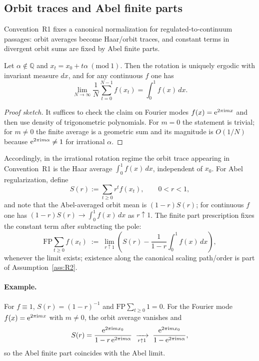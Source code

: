 \subsection{Orbit traces and Abel finite parts}
Convention~R1 fixes a canonical normalization for regulated-to-continuum passages: orbit averages become Haar/orbit traces, and constant terms in divergent orbit sums are fixed by Abel finite parts.
\begin{proposition}
Let $\alpha\notin\mathbb{Q}$ and $x_t=x_0+t\alpha\ (\mathrm{mod}\ 1)$. Then the rotation is uniquely ergodic with invariant measure $dx$, and for any continuous $f$ one has
\begin{equation}
    \lim_{N\to\infty}\frac{1}{N}\sum_{t=0}^{N-1} f(x_t)=\int_{0}^{1} f(x)\,dx.
\end{equation}
\end{proposition}
\begin{proof}[Proof sketch]
It suffices to check the claim on Fourier modes $f(x)=\mathrm{e}^{2\pi \mathrm{i} m x}$ and then use density of trigonometric polynomials. For $m=0$ the statement is trivial; for $m\neq 0$ the finite average is a geometric sum and its magnitude is $O(1/N)$ because $\mathrm{e}^{2\pi \mathrm{i} m\alpha}\neq 1$ for irrational $\alpha$.
\end{proof}
\par
Accordingly, in the irrational rotation regime the orbit trace appearing in Convention~R1 is the Haar average $\int_{0}^{1} f(x)\,dx$, independent of $x_0$. For Abel regularization, define
\begin{equation}
    S(r):=\sum_{t\ge 0} r^{t} f(x_t),\qquad 0<r<1,
\end{equation}
and note that the Abel-averaged orbit mean is $(1-r)S(r)$; for continuous $f$ one has $(1-r)S(r)\to \int_{0}^{1} f(x)\,dx$ as $r\uparrow 1$. The finite part prescription fixes the constant term after subtracting the pole:
\begin{equation}
    \mathrm{FP}\sum_{t\ge 0} f(x_t)\;:=\;\lim_{r\uparrow 1}\left(S(r)-\frac{1}{1-r}\int_{0}^{1} f(x)\,dx\right),
\end{equation}
\noindent
whenever the limit exists; existence along the canonical scaling path/order is part of Assumption~\ref{ass:R2}.
\paragraph{Example.}
For $f\equiv 1$, $S(r)=(1-r)^{-1}$ and $\mathrm{FP}\sum_{t\ge 0}1=0$. For the Fourier mode $f(x)=\mathrm{e}^{2\pi \mathrm{i} m x}$ with $m\neq 0$, the orbit average vanishes and
\begin{equation}
    S(r)=\frac{\mathrm{e}^{2\pi \mathrm{i} m x_0}}{1-r\,\mathrm{e}^{2\pi \mathrm{i} m\alpha}}\;\xrightarrow[r\uparrow 1]{}\;\frac{\mathrm{e}^{2\pi \mathrm{i} m x_0}}{1-\mathrm{e}^{2\pi \mathrm{i} m\alpha}},
\end{equation}
so the Abel finite part coincides with the Abel limit.
